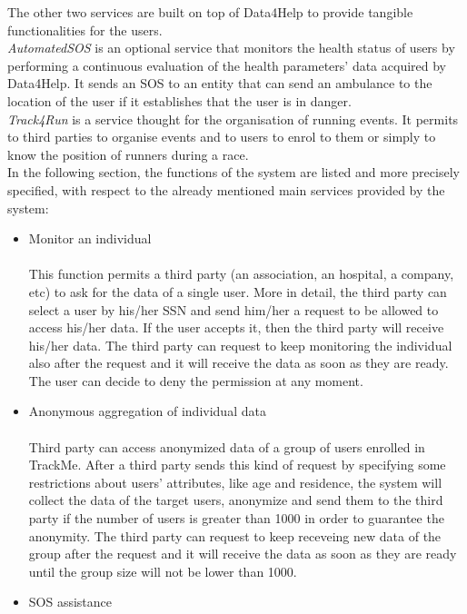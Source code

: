 \documentclass{article}
\begin{document}
\begin{legal}
\begin{legal}
{The other two services are built on top of Data4Help to provide tangible functionalities for the users.\\
\textit{AutomatedSOS }is an optional service that monitors the health status of users by performing a continuous evaluation of the health parameters' data acquired by Data4Help. It sends an SOS to an entity that can send an ambulance to the location of the user if it establishes that the user is in danger.\\
\textit{Track4Run} is a service thought for the organisation of running events. It permits to third parties to organise events and to users to enrol to them or simply to know the position of runners during a race.\\
In the following section, the functions of the system are listed and more precisely specified, with
respect to the already mentioned main services provided by the system:
		\begin{itemize}
		\item Monitor an individual\\\\
		This function permits a third party (an association, an hospital, a company, etc) to ask for the data of a single user. More in detail, the third party can select a user by his/her SSN and send him/her a request to be allowed to access his/her data. If the user accepts it, then the third party will receive his/her data. The third party can request to keep monitoring the individual also after the request and it will receive the data as soon as they are ready. The user can decide to deny the permission at any moment. \\
		\item Anonymous aggregation of individual data\\\\
		Third party can access anonymized data of a group of users enrolled in TrackMe. After a third party sends this kind of request by specifying some restrictions about users’ attributes, like age and residence, the system will collect the data of the target users, anonymize and send them to the third party if the number of users is greater than 1000 in order to guarantee the anonymity. The third party can request to keep receveing new data of the group after the request and it will receive the data as soon as they are ready until the group size will not be lower than 1000.\\
		\item SOS assistance\\\\

\end{itemize}}
\end{legal}
\end{legal}
\end{document}
